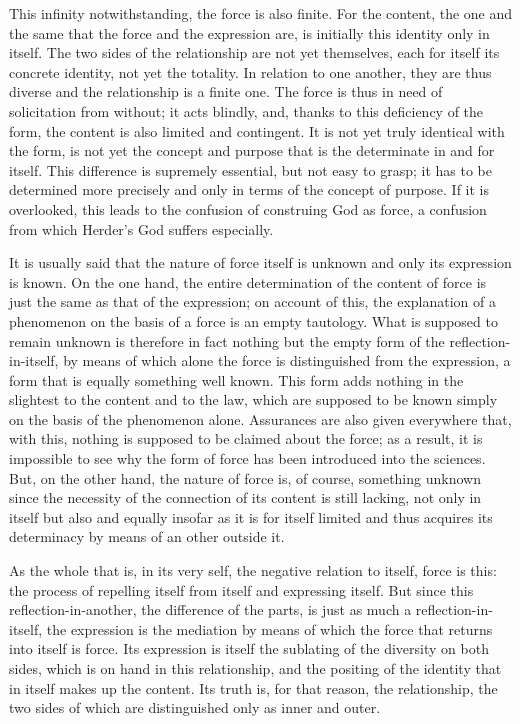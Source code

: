     This infinity notwithstanding, the force is also finite.
    For the content, the one and the same that the force and the expression are, is
    initially this identity only in itself.
    The two sides of the relationship
    are not yet themselves, each for itself its concrete identity, not yet the
    totality.
    In relation to one another, they are thus diverse and the
    relationship is a finite one.
    The force is thus in need of solicitation
    from without;
    it acts blindly, and, thanks to this deficiency of the form,
    the content is also limited and contingent.
    It is not yet truly
    identical with the form, is not yet the concept and purpose that is
    the determinate in and for itself.
    This difference is supremely essential, but not easy to grasp;
    it has to be determined more precisely and only in terms of the concept of purpose.
    If it is overlooked, this leads to the confusion of construing God as force,
    a confusion from which Herder's God suffers especially.

    It is usually said that the nature of force itself is unknown
    and only its expression is known.
    On the one hand, the entire determination of the content of force is
    just the same as that of the expression;
    on account of this, the explanation of a phenomenon
    on the basis of a force is an empty tautology.
    What is supposed to
    remain unknown is therefore in fact nothing but the empty form
    of the reflection-in-itself, by means of which alone the force is
    distinguished from the expression, a form that is equally
    something well known.
    This form adds nothing in the slightest to the content and to the law,
    which are supposed to be known simply on the basis of the phenomenon alone.
    Assurances are also given everywhere that, with this, nothing is
    supposed to be claimed about the force; as a result, it is impossible to
    see why the form of force has been introduced into the sciences.
    But, on the other hand, the nature of force is, of course, something
    unknown since the necessity of the connection of its content is still
    lacking, not only in itself but also and equally insofar as it is for itself
    limited and thus acquires its determinacy by means of an other outside it.

As the whole that is, in its very self,
the negative relation to itself, force is this:
the process of repelling itself from itself and expressing itself.
But since this reflection-in-another, the difference of the parts, is just as much
a reflection-in-itself, the expression is the mediation by means of which the
force that returns into itself is force.
Its expression is itself the sublating of
the diversity on both sides, which is on hand in this relationship, and
the positing of the identity that in itself makes up the content.
Its truth is, for that reason, the relationship,
the two sides of which are distinguished only as inner and outer.

